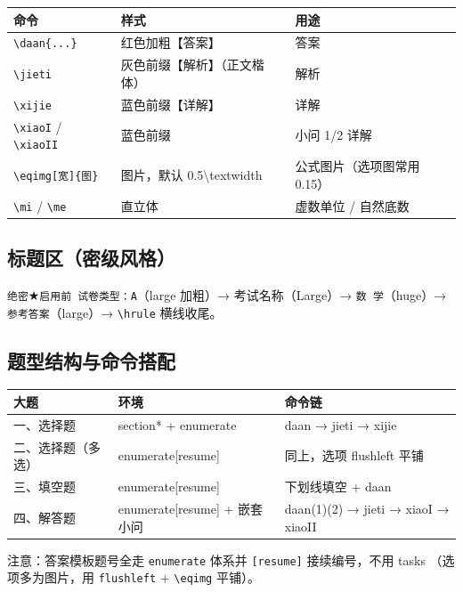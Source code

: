 \documentclass[11pt,a4paper]{ctexart}
\begin{document}
\begin{center}
\begin{tabular}{lll}
\toprule
命令 & 样式 & 用途 \\
\midrule
\texttt{\textbackslash daan\{...\}} & 红色加粗【答案】 & 答案 \\
\texttt{\textbackslash jieti} & 灰色前缀【解析】（正文楷体） & 解析 \\
\texttt{\textbackslash xijie} & 蓝色前缀【详解】 & 详解 \\
\texttt{\textbackslash xiaoI} / \texttt{\textbackslash xiaoII} & 蓝色前缀 & 小问 1/2 详解 \\
\texttt{\textbackslash eqimg[宽]\{图\}} & 图片，默认 0.5\textbackslash textwidth & 公式图片（选项图常用 0.15） \\
\texttt{\textbackslash mi} / \texttt{\textbackslash me} & 直立体 & 虚数单位 / 自然底数 \\
\bottomrule
\end{tabular}
\end{center}

\subsection{标题区（密级风格）}

\texttt{绝密}$\bigstar$\texttt{启用前 试卷类型：A}（large 加粗）→ 考试名称（Large）→
\texttt{数 学}（huge）→ \texttt{参考答案}（large）→ \texttt{\textbackslash hrule} 横线收尾。

\subsection{题型结构与命令搭配}

\begin{center}
\begin{tabular}{lll}
\toprule
大题 & 环境 & 命令链 \\
\midrule
一、选择题 & section* + enumerate & daan → jieti → xijie \\
二、选择题（多选） & enumerate[resume] & 同上，选项 flushleft 平铺 \\
三、填空题 & enumerate[resume] & 下划线填空 + daan \\
四、解答题 & enumerate[resume] + 嵌套小问 & daan(1)(2) → jieti → xiaoI → xiaoII \\
\bottomrule
\end{tabular}
\end{center}

注意：答案模板题号全走 \texttt{enumerate} 体系并 \texttt{[resume]} 接续编号，不用 tasks
（选项多为图片，用 \texttt{flushleft} + \texttt{\textbackslash eqimg} 平铺）。
\end{document}
